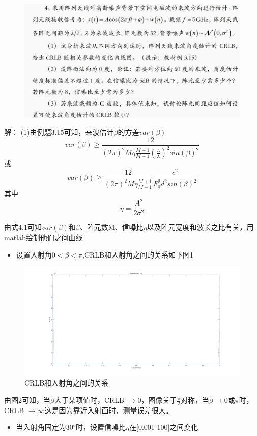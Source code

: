 \documentclass{article}
\begin{document}
\begin{figure}
	\centering
	\includegraphics[width=1\linewidth]{4.jpg}
\end{figure}
解：
(1)由例题3.15可知，来波估计$\beta$的方差$var(\beta)$
\begin{equation}
	var(\beta) \geq \frac{12}{(2\pi)^{2}M\eta\frac{M+1}{M-1}(\frac{L}{\lambda})^{2}sin(\beta)^{2}}
	\tag{4.1}
\end{equation}
或
\begin{equation}
	var(\beta) \geq \frac{12}{(2\pi)^{2}M\eta\frac{M+1}{M-1}}\frac{c^2}{F_0^2d^2sin(\beta)^2} \tag{4.2}
\end{equation}
其中$$\eta=\frac{A^{2}}{2\sigma^{2}}$$

由式4.1可知$var(\beta)$和$\beta$、阵元数M、信噪比$\eta$以及阵元宽度和波长之比有关，用matlab绘制他们之间曲线

\begin{itemize}
	\item 设置入射角$0<\beta<\pi$,CRLB和入射角之间的关系如下图1

\end{itemize}

\begin{figure}
	\centering
	\includegraphics[width=0.75\linewidth]{CRLB 入射角.png}
	\caption{CRLB和入射角之间的关系}

\end{figure}
由图2可知，当$\beta$大于某项值时，CRLB $\to 0$，图像关于$\frac{\pi}{2}$对称，当$\beta \to 0 或 \pi 时$，CRLB $\to \infty$这是因为靠近入射面时，测量误差很大。
\begin{itemize}
	\item 当入射角固定为30°时，设置信噪比$\eta$在[0.001  100]之间变化
\end{itemize}
\end{document}
